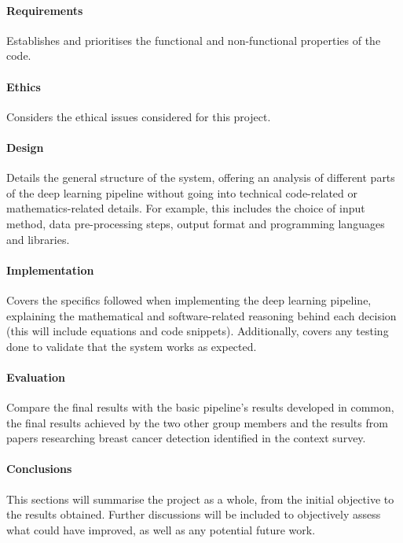 \paragraph{Requirements}
Establishes and prioritises the functional and non-functional properties of the code.

\paragraph{Ethics}
Considers the ethical issues considered for this project.

\paragraph{Design}
Details the general structure of the system, offering an analysis of different parts of the deep learning pipeline without going into technical code-related or mathematics-related details. For example, this includes the choice of input method, data pre-processing steps, output format and programming languages and libraries.

\paragraph{Implementation}
Covers the specifics followed when implementing the deep learning pipeline, explaining the mathematical and software-related reasoning behind each decision (this will include equations and code snippets). Additionally, covers any testing done to validate that the system works as expected.

\paragraph{Evaluation}
Compare the final results with the basic pipeline’s results developed in common, the final results achieved by the two other group members and the results from papers researching breast cancer detection identiﬁed in the context survey.

\paragraph{Conclusions}
This sections will summarise the project as a whole, from the initial objective to the results obtained. Further discussions will be included to objectively assess what could have improved, as well as any potential future work.